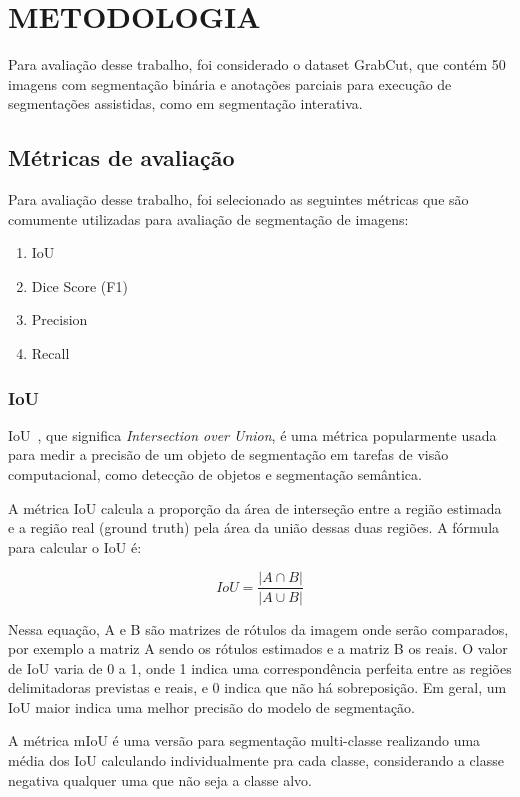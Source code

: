 \chapter{METODOLOGIA}\label{cap:metodologia}

Para avaliação desse trabalho, foi considerado o dataset GrabCut, que
contém 50 imagens com segmentação binária e anotações parciais para
execução de segmentações assistidas, como em segmentação interativa.


\section{Métricas de avaliação}\label{sec:metricas-avaliacao}

Para avaliação desse trabalho, foi selecionado as seguintes métricas
que são comumente utilizadas para avaliação de segmentação de imagens:

\begin{enumerate}
\item IoU
\item Dice Score (F1)
\item Precision
\item Recall
\end{enumerate}

\subsection{IoU}\label{sec:iou}

IoU~\cite{rezatofighi2019generalized}, que significa
\textit{Intersection over Union}, é uma métrica popularmente usada
para medir a precisão de um objeto de segmentação em tarefas de visão
computacional, como detecção de objetos e segmentação semântica.

A métrica IoU calcula a proporção da área de interseção entre a região
estimada e a região real (ground truth) pela área da união dessas duas
regiões. A fórmula para calcular o IoU é:

\begin{equation}
  IoU = \dfrac{\left| A \cap B \right|}{\left| A \cup B \right|}
\end{equation}


Nessa equação, A e B são matrizes de rótulos da imagem onde serão
comparados, por exemplo a matriz A sendo os rótulos estimados e a
matriz B os reais. O valor de IoU varia de 0 a 1, onde 1 indica uma
correspondência perfeita entre as regiões delimitadoras previstas e
reais, e 0 indica que não há sobreposição. Em geral, um IoU maior
indica uma melhor precisão do modelo de segmentação.

A métrica mIoU é uma versão para segmentação multi-classe realizando
uma média dos IoU calculando individualmente pra cada classe,
considerando a classe negativa qualquer uma que não seja a classe alvo.
